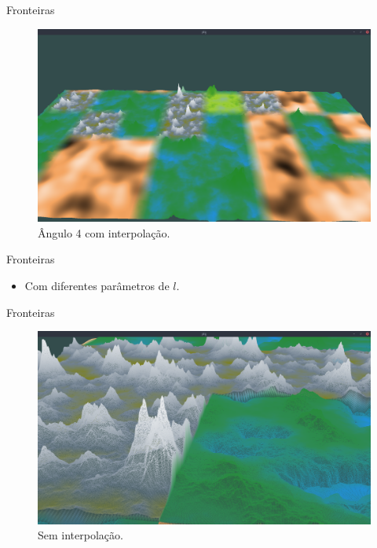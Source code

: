 \begin{frame}{Fronteiras}
    \begin{figure}[H]
        \centering
        \includegraphics[width=.9\textwidth]{img/border/a9/4c.png}
        \caption{Ângulo 4 com interpolação.}
        \label{fig:img_border_a9_4c}
    \end{figure}
    
\end{frame}

\begin{frame}{Fronteiras}
    \begin{itemize} \setlength\itemsep{1em}
        \item Com diferentes parâmetros de $l$.
    \end{itemize}
    
    
\end{frame}

\begin{frame}{Fronteiras}
    \begin{figure}[H]
        \centering
        \includegraphics[width=.9\textwidth]{img/borders/0lm.png}
        \caption{Sem interpolação.}
        \label{fig:img_borders_0lm}
    \end{figure}
    
\end{frame}

